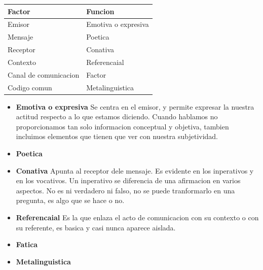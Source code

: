 \documentclass[a4paper,12pt,titlepage]{article} %
\begin{document}
\begin{center}
 \begin{tabular}{|l|l|}
   \hline
  \textbf{Factor}& \textbf{Funcion} \\
  \hline
  Emisor& Emotiva o expresiva\\
  \hline
  Mensaje& Poetica\\
  \hline
  Receptor& Conativa\\
  \hline
  Contexto& Referencaial\\
  \hline
  Canal de comunicacion& Factor\\
  \hline
  Codigo comun& Metalinguistica\\
  \hline
\end{tabular} 
\end{center}

\begin{itemize}
  \item \textbf{Emotiva o expresiva}
    Se centra en el emisor, y permite expresar la nuestra actitud respecto a lo que estamos diciendo. Cuando hablamos no proporcionamos tan solo 
    informacion conceptual y objetiva, tambien incluimos elementos que tienen que ver con nuestra subjetividad.
  \item \textbf{Poetica} 
  \item \textbf{Conativa}
    Apunta al receptor dele mensaje. Es evidente en los inperativos y en los vocativos. Un inperativo se diferencia de una afirmacion en varios
    aspectos. No es ni verdadero ni falso, no se puede tranformarlo en una pregunta, es algo que se hace o no. 
  \item \textbf{Referencaial}
    Es la que enlaza el acto de comunicacion con su contexto o con su referente, es basica y casi nunca aparece aislada.
  \item \textbf{Fatica}

  \item \textbf{Metalinguistica} 
\end{itemize}
\end{document}
